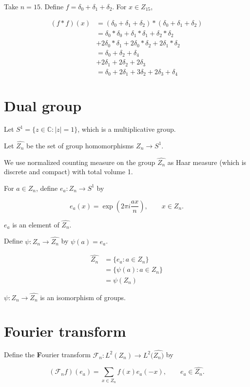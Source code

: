 \documentclass[11pt]{article} %
\begin{document}
Take $n=15$. Define $f=\delta_0+\delta_1+\delta_2$. For $x \in Z_{15}$,

\begin{align*}
(f*f)(x)&=(\delta_0+\delta_1+\delta_2)*(\delta_0+\delta_1+\delta_2)\\
&=\delta_0 * \delta_0 + \delta_1*\delta_1 + \delta_2 * \delta_2\\
& + 2\delta_0 * \delta_1 + 2\delta_0 * \delta_2 + 2\delta_1*\delta_2\\
&=\delta_0 + \delta_2 + \delta_4\\
&+2\delta_1 + 2\delta_2 + 2 \delta_3\\
&=\delta_0 + 2\delta_1 + 3\delta_2 + 2\delta_3 + \delta_4
\end{align*}


\section{Dual group}

Let $S^1=\{z \in \mathbb{C} : |z| = 1\}$, which is a multiplicative group.

Let $\widehat{Z_n}$ be the set of group homomorphisms $Z_n \to S^1$.

We use normalized counting measure on the group $\widehat{Z_n}$ as Haar measure (which is discrete and compact) with total volume 1.

For $a \in Z_n$, define $e_a:Z_n \to S^1$ by

$$
e_a(x) = \exp\left(2\pi i \dfrac{ax}{n}\right), \qquad x \in Z_n.
$$

$e_a$ is an element of $\widehat{Z_n}$.

Define $\psi:Z_n \to \widehat{Z_n}$ by $\psi(a)=e_a$. 

\begin{align*}
\widehat{Z_n} &= \{e_a : a \in Z_n\}\\
&= \{\psi(a): a \in Z_n\}\\
&= \psi(Z_n)
\end{align*}

$\psi:Z_n \to \widehat{Z_n}$ is an isomorphism of groups.

\section{Fourier transform}

Define the {\textbf Fourier transform} $\mathscr{F}_n:L^2(Z_n) \to L^2(\widehat{Z_n)}$ by

$$
(\mathscr{F}_n f)(e_a) = \sum_{x \in Z_n} f(x) e_a(-x), \qquad e_a \in \widehat{Z_n}.
$$
\end{document}
